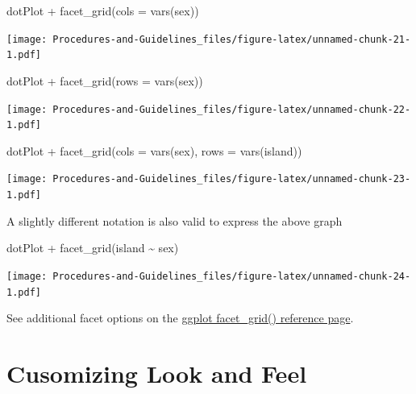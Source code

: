 \documentclass[
]{book}
\newenvironment{Shaded}{\begin{snugshade}}{\end{snugshade}}
\newcommand{\AttributeTok}[1]{\textcolor[rgb]{0.77,0.63,0.00}{#1}}
\newcommand{\FunctionTok}[1]{\textcolor[rgb]{0.00,0.00,0.00}{#1}}
\newcommand{\NormalTok}[1]{#1}
\newcommand{\SpecialCharTok}[1]{\textcolor[rgb]{0.00,0.00,0.00}{#1}}
\begin{document}
\begin{Shaded}
\begin{Highlighting}[]
\NormalTok{dotPlot }\SpecialCharTok{+}
  \FunctionTok{facet\_grid}\NormalTok{(}\AttributeTok{cols =} \FunctionTok{vars}\NormalTok{(sex))}
\end{Highlighting}
\end{Shaded}

\texttt{[image: Procedures-and-Guidelines\_files/figure-latex/unnamed-chunk-21-1.pdf]}

\begin{Shaded}
\begin{Highlighting}[]
\NormalTok{dotPlot }\SpecialCharTok{+}
  \FunctionTok{facet\_grid}\NormalTok{(}\AttributeTok{rows =} \FunctionTok{vars}\NormalTok{(sex))}
\end{Highlighting}
\end{Shaded}

\texttt{[image: Procedures-and-Guidelines\_files/figure-latex/unnamed-chunk-22-1.pdf]}

\begin{Shaded}
\begin{Highlighting}[]
\NormalTok{dotPlot }\SpecialCharTok{+}
  \FunctionTok{facet\_grid}\NormalTok{(}\AttributeTok{cols =} \FunctionTok{vars}\NormalTok{(sex), }\AttributeTok{rows =} \FunctionTok{vars}\NormalTok{(island))}
\end{Highlighting}
\end{Shaded}

\texttt{[image: Procedures-and-Guidelines\_files/figure-latex/unnamed-chunk-23-1.pdf]}

A slightly different notation is also valid to express the above graph

\begin{Shaded}
\begin{Highlighting}[]
\NormalTok{dotPlot }\SpecialCharTok{+}
  \FunctionTok{facet\_grid}\NormalTok{(island }\SpecialCharTok{\textasciitilde{}}\NormalTok{ sex)}
\end{Highlighting}
\end{Shaded}

\texttt{[image: Procedures-and-Guidelines\_files/figure-latex/unnamed-chunk-24-1.pdf]}

See additional facet options on the \href{https://ggplot2.tidyverse.org/reference/facet_grid.html}{ggplot facet\_grid() reference page}.

\hypertarget{cusomizing-look-and-feel}{%
\section{Cusomizing Look and Feel}\label{cusomizing-look-and-feel}}
\end{document}
